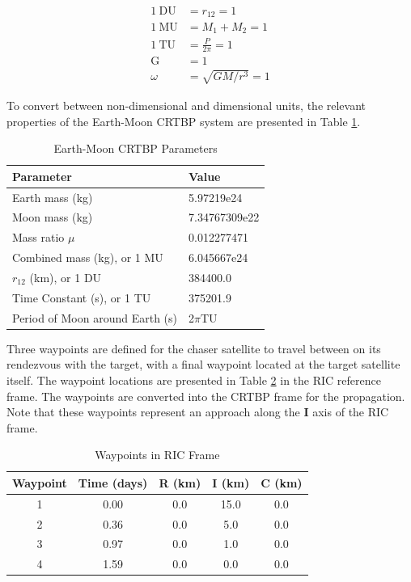 \documentclass[a4paper]{article}
\begin{document}
\begin{equation*} \label{eq:nondimen}
\begin{aligned}
\mathrm{1 \: DU} &= r_{12} = 1 \\           %
\mathrm{1 \: MU} &= M_1 + M_2 = 1 \\
\mathrm{1 \: TU} &= \frac{P}{2\pi} = 1 \\
\mathrm{G} &= 1 \\
\omega &= \sqrt{GM/r^3} = 1
\end{aligned}
\end{equation*}

To convert between non-dimensional and dimensional units, the relevant properties of the Earth-Moon CRTBP system are presented in Table \ref{tab:Environment_1}.   

\begin{table}[h] 
	\begin{center}
		\begin{tabular}{l l}
			\toprule
			Parameter   & Value \\
			\midrule
			Earth mass (kg) & 5.97219e24 \\
			Moon mass (kg) & 7.34767309e22 \\
			Mass ratio \(\mu\)      & 0.012277471 \\
			Combined mass (kg), or 1 MU & 6.045667e24 \\
			\(r_{12}\) (km), or 1 DU & 384400.0 \\
			Time Constant (s), or 1 TU & 375201.9 \\
			Period of Moon around Earth (s) & 2\(\pi\)TU \\
			\bottomrule
		\end{tabular}
		\caption{Earth-Moon CRTBP Parameters}
		\label{tab:Environment_1}
	\end{center}
\end{table}

Three waypoints are defined for the chaser satellite to travel between on its rendezvous with the target, with a final waypoint located at the target satellite itself.  The waypoint locations are presented in Table \ref{tab:Waypoints_1} in the RIC reference frame.  The waypoints are converted into the CRTBP frame for the propagation.  Note that these waypoints represent an approach along the \(\mathbf{I}\) axis of the RIC frame. 

\begin{table}[h] 
	\begin{center}
		\begin{tabular}{ccccc}
			\toprule
			Waypoint   & Time (days) & R (km) & I (km) & C (km) \\
			\midrule
			1 & 0.00 & 0.0 & 15.0 & 0.0 \\
			2 & 0.36 & 0.0 & 5.0 & 0.0 \\
			3 & 0.97 & 0.0 & 1.0 & 0.0 \\
			4 & 1.59 & 0.0 & 0.0 & 0.0 \\
			\bottomrule
		\end{tabular}
		\caption{Waypoints in RIC Frame}
		\label{tab:Waypoints_1}
	\end{center}
\end{table} 
\end{document}
